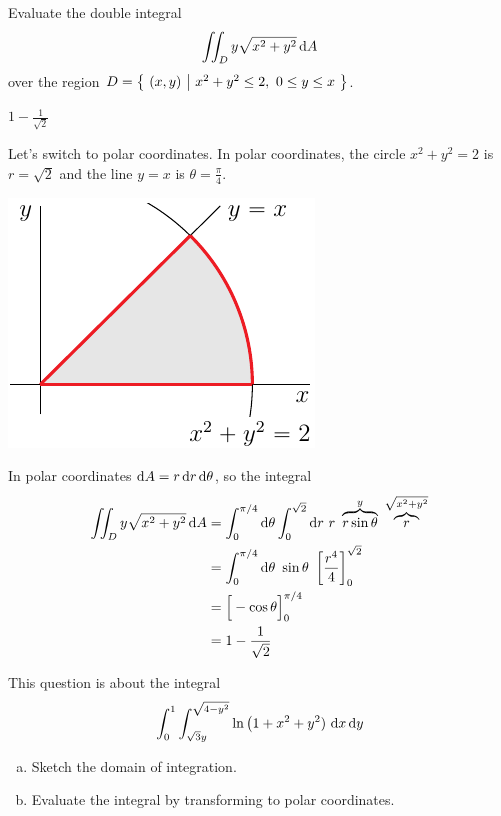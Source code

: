 \begin{question}[M200 2011D] %
Evaluate the double integral
\begin{equation*}
\iint_D y\sqrt{x^2+y^2}\,\mathrm{d}A
\end{equation*}
over the region
$D =\big\{ \ (x,y)\ \big|\  x^2+y^2\le 2,\ 0\le y\le x\ \big\}$.
\end{question}

%

\begin{answer}
$1-\frac{1}{\sqrt{2}}$
\end{answer}

\begin{solution}
 Let's switch to polar coordinates. In polar coordinates,
the circle $x^2+y^2=2$ is $r=\sqrt{2}$ and the line $y=x$ is
$\theta=\frac{\pi}{4}$.
\begin{center}
     \includegraphics{fig/OE11D_5bb.pdf}\qquad
\end{center}
In polar coordinates $\mathrm{d}A = r\,\mathrm{d}r\,\mathrm{d}\theta$, so the integral
\begin{align*}
\dblInt_D y\sqrt{x^2+y^2}\,\dee{A}
&=\int_0^{\pi/4}\dee{\theta}\int_0^{\sqrt{2}}\dee{r}\ r\  
 \overbrace{r\sin\theta}^{y}\ \overbrace{r}^{\sqrt{x^2+y^2}} \\
&=\int_0^{\pi/4}\dee{\theta}\ \sin\theta\ 
     \left[\frac{r^4}{4}\right]_0^{\sqrt{2}} \\
&=\Big[-\cos\theta\Big]_0^{\pi/4} \\
&= 1-\frac{1}{\sqrt{2}}
\end{align*}
\end{solution}

\begin{question}[M200 2013D] %
This question is about the integral
\begin{equation*}
\int_0^1 \int_{\sqrt{3}y}^{\sqrt{4-y^2}} \ln\big(1+x^2+y^2)\
                         \mathrm{d}x\,\mathrm{d}y
\end{equation*}
\begin{enumerate}[(a)]
\item
Sketch the domain of integration.
\item
Evaluate the integral by transforming to polar coordinates.
\end{enumerate}
\end{question}

